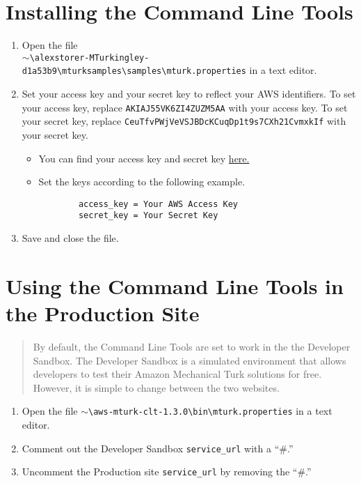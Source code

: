 \documentclass[10pt]{article}
\begin{document}
\section*{Installing the Command Line Tools}

\begin{enumerate}
	\item Open the file\\ $\sim$\verb+\alexstorer-MTurkingley-d1a53b9\mturksamples\samples\mturk.properties+ in a text editor.
	\item Set your access key and your secret key to reflect your AWS identifiers. To set your access key, replace \verb+AKIAJ55VK6ZI4ZUZM5AA+ with your
access key. To set your secret key, replace \verb+CeuTfvPWjVeVSJBDcKCuqDp1t9s7CXh21CvmxkIf+ with your secret key.
	\begin{itemize}
		\item You can find your access key and secret key \href{https://aws-portal.amazon.com/gp/aws/securityCredentials}{here.}
		\item Set the keys according to the following example. 
		\begin{verbatim}
		access_key = Your AWS Access Key
		secret_key = Your Secret Key
		\end{verbatim}
	\end{itemize}
	\item Save and close the file.
\end{enumerate}

\section*{Using the Command Line Tools in the Production Site}

\begin{quotation}
\noindent By default, the Command Line Tools are set to work in the the Developer Sandbox. The Developer Sandbox is a simulated environment that allows developers to test their Amazon Mechanical Turk solutions for free. However, it is simple to change between the two websites. 
\end{quotation}

\begin{enumerate}
	\item Open the file $\sim$\verb+\aws-mturk-clt-1.3.0\bin\mturk.properties+ in a text editor.
        \item Comment out the Developer Sandbox \verb+service_url+ with a ``\#.''
	\item Uncomment the Production site \verb+service_url+ by removing the ``\#.''
	
\end{enumerate}
\end{document}
